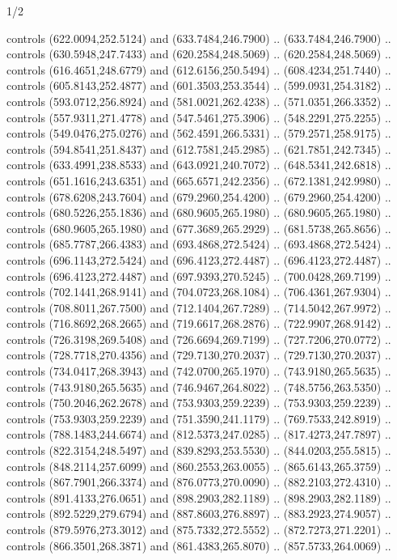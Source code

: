 \begin{flagdescription}{1/2}
\begin{scope}[xshift=0.5\flaglength,yshift=0.5\flagwidth,scale=\flagwidth/759]
\begin{scope}[y=0.8pt, x=0.8pt, yscale=-1,shift={(-720,-480)}]
  controls (622.0094,252.5124) and (633.7484,246.7900) .. (633.7484,246.7900) ..
  controls (630.5948,247.7433) and (620.2584,248.5069) .. (620.2584,248.5069) ..
  controls (616.4651,248.6779) and (612.6156,250.5494) .. (608.4234,251.7440) ..
  controls (605.8143,252.4877) and (601.3503,253.3544) .. (599.0931,254.3182) ..
  controls (593.0712,256.8924) and (581.0021,262.4238) .. (571.0351,266.3352) ..
  controls (557.9311,271.4778) and (547.5461,275.3906) .. (548.2291,275.2255) ..
  controls (549.0476,275.0276) and (562.4591,266.5331) .. (579.2571,258.9175) ..
  controls (594.8541,251.8437) and (612.7581,245.2985) .. (621.7851,242.7345) ..
  controls (633.4991,238.8533) and (643.0921,240.7072) .. (648.5341,242.6818) ..
  controls (651.1616,243.6351) and (665.6571,242.2356) .. (672.1381,242.9980) ..
  controls (678.6208,243.7604) and (679.2960,254.4200) .. (679.2960,254.4200) ..
  controls (680.5226,255.1836) and (680.9605,265.1980) .. (680.9605,265.1980) ..
  controls (680.9605,265.1980) and (677.3689,265.2929) .. (681.5738,265.8656) ..
  controls (685.7787,266.4383) and (693.4868,272.5424) .. (693.4868,272.5424) ..
  controls (696.1143,272.5424) and (696.4123,272.4487) .. (696.4123,272.4487) ..
  controls (696.4123,272.4487) and (697.9393,270.5245) .. (700.0428,269.7199) ..
  controls (702.1441,268.9141) and (704.0723,268.1084) .. (706.4361,267.9304) ..
  controls (708.8011,267.7500) and (712.1404,267.7289) .. (714.5042,267.9972) ..
  controls (716.8692,268.2665) and (719.6617,268.2876) .. (722.9907,268.9142) ..
  controls (726.3198,269.5408) and (726.6694,269.7199) .. (727.7206,270.0772) ..
  controls (728.7718,270.4356) and (729.7130,270.2037) .. (729.7130,270.2037) ..
  controls (734.0417,268.3943) and (742.0700,265.1970) .. (743.9180,265.5635) ..
  controls (743.9180,265.5635) and (746.9467,264.8022) .. (748.5756,263.5350) ..
  controls (750.2046,262.2678) and (753.9303,259.2239) .. (753.9303,259.2239) ..
  controls (753.9303,259.2239) and (751.3590,241.1179) .. (769.7533,242.8919) ..
  controls (788.1483,244.6674) and (812.5373,247.0285) .. (817.4273,247.7897) ..
  controls (822.3154,248.5497) and (839.8293,253.5530) .. (844.0203,255.5815) ..
  controls (848.2114,257.6099) and (860.2553,263.0055) .. (865.6143,265.3759) ..
  controls (867.7901,266.3374) and (876.0773,270.0090) .. (882.2103,272.4310) ..
  controls (891.4133,276.0651) and (898.2903,282.1189) .. (898.2903,282.1189) ..
  controls (892.5229,279.6794) and (887.8603,276.8897) .. (883.2923,274.9057) ..
  controls (879.5976,273.3012) and (875.7332,272.5552) .. (872.7273,271.2201) ..
  controls (866.3501,268.3871) and (861.4383,265.8070) .. (857.5733,264.0069) ..

\end{scope}
\end{scope}
\end{flagdescription}
